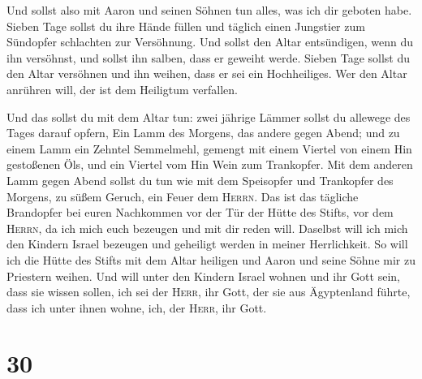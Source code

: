  Und sollst also mit Aaron und seinen Söhnen tun alles,
was ich dir geboten habe. Sieben Tage sollst du ihre Hände füllen
 und täglich einen Jungstier zum Sündopfer schlachten zur
Versöhnung. Und sollst den Altar entsündigen, wenn du ihn versöhnst, und
sollst ihn salben, dass er geweiht werde.  Sieben Tage
sollst du den Altar versöhnen und ihn weihen, dass er sei ein
Hochheiliges. Wer den Altar anrühren will, der ist dem Heiligtum
verfallen.

 Und das sollst du mit dem Altar tun: zwei jährige Lämmer
sollst du allewege des Tages darauf opfern,  Ein Lamm des
Morgens, das andere gegen Abend;  und zu einem Lamm ein
Zehntel Semmelmehl, gemengt mit einem Viertel von einem Hin gestoßenen
Öls, und ein Viertel vom Hin Wein zum Trankopfer.  Mit
dem anderen Lamm gegen Abend sollst du tun wie mit dem Speisopfer und
Trankopfer des Morgens, zu süßem Geruch, ein Feuer dem \textsc{Herrn}.
 Das ist das tägliche Brandopfer bei euren Nachkommen vor
der Tür der Hütte des Stifts, vor dem \textsc{Herrn}, da ich mich euch
bezeugen und mit dir reden will.  Daselbst will ich mich
den Kindern Israel bezeugen und geheiligt werden in meiner Herrlichkeit.
 So will ich die Hütte des Stifts mit dem Altar heiligen
und Aaron und seine Söhne mir zu Priestern weihen.  Und
will unter den Kindern Israel wohnen und ihr Gott sein, 
dass sie wissen sollen, ich sei der \textsc{Herr}, ihr Gott, der sie aus
Ägyptenland führte, dass ich unter ihnen wohne, ich, der \textsc{Herr},
ihr Gott.

\hypertarget{section-29}{%
\section{30}\label{section-29}}

